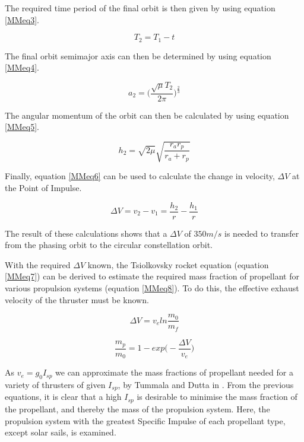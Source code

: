 The required time period of the final orbit is then given by using equation \ref{MMeq3}.

\begin{equation}
	T_2 = T_1 -t
	\label{MMeq3}
\end{equation}

The final orbit semimajor axis can then be determined by using equation \ref{MMeq4}.

\begin{equation}
	a_2 = \bigg(\frac{\sqrt{\mu}T_2}{2\pi}\bigg)^{\frac{2}{3}}
	\label{MMeq4}
\end{equation}

The angular momentum of the orbit can then be calculated by using equation \ref{MMeq5}.

\begin{equation}
	h_2 = \sqrt{2\mu}\sqrt{\frac{r_ar_p}{r_a+r_p}}
	\label{MMeq5}
\end{equation}

Finally, equation \ref{MMeq6} can be used to calculate the change in velocity, $\Delta V$ at the Point of Impulse.

\begin{equation}
	\Delta V = v_2 - v_1 = \frac{h_2}{r}-\frac{h_1}{r}
	\label{MMeq6}
\end{equation}

The result of these calculations shows that a $\Delta V$ of $350 m/s$ is needed to transfer from the phasing orbit to the circular constellation orbit.

With the required $\Delta V$ known, the Tsiolkovsky rocket equation (equation \ref{MMeq7}) can be derived to estimate the required mass fraction of propellant for various propulsion systems (equation \ref{MMeq8}). To do this, the effective exhaust velocity of the thruster must be known.

\begin{equation}
	\Delta V = v_e ln \frac{m_0}{m_f}
	\label{MMeq7}
\end{equation}

\begin{equation}
	\frac{m_p}{m_0} = 1-exp\bigg(-\frac{\Delta V}{v_e}\bigg)
	\label{MMeq8}
\end{equation}

As $v_e = g_0 I_{sp}$ we can approximate the mass fractions of propellant needed for a variety of thrusters of given $I_{sp}$, by Tummala and Dutta in \cite{Tummala}. From the previous equations, it is clear that a high $I_{sp}$ is desirable to minimise the mass fraction of the propellant, and thereby the mass of the propulsion system. Here, the propulsion system with the greatest Specific Impulse of each propellant type, except solar sails, is examined.

